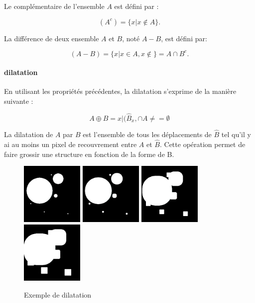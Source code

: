 Le complémentaire de l'ensemble $A$ est défini par :

\begin{equation}
  (A^c) = \{x|x \not\in A\}. 
\end{equation}

La différence de deux ensemble $A$ et $B$, noté $A - B$, est défini par:

\begin{equation}
  (A-B) = \{x|x \in A, x\not\in \} = A \cap B^c.  
\end{equation}


\paragraph{dilatation}
En utilisant les propriétés précédentes, la dilatation s'exprime de la manière suivante :

\begin{equation}
 A \oplus B = {x|(\widehat{B}_x, \cap A \neq = \emptyset }
\end{equation}

La dilatation de $A$ par $B$ est l'ensemble de tous les déplacements de $\widehat{B}$ tel qu'il y ai au moins un pixel de recouvrement entre $A$ et $\widehat{B}$. Cette opération permet de faire grossir une structure en fonction de la forme de B.

\begin{figure}
  \centering
  \includegraphics[height=3cm]{Images/morpho_init.png}
  \includegraphics[height=3cm]{Images/morpho_dilate_k5.png}
  \includegraphics[height=3cm]{Images/morpho_dilate_k21.png}
  \includegraphics[height=3cm]{Images/morpho_dilate_k31.png}
  \label{fig:morpho_dilation}
  \caption{Exemple de dilatation}
\end{figure}

